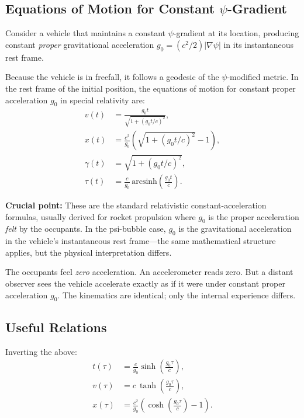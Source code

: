 \documentclass[aps,prd,twocolumn,superscriptaddress,nofootinbib]{revtex4-2}
\begin{document}
\subsection{Equations of Motion for Constant $\psi$-Gradient}

Consider a vehicle that maintains a constant $\psi$-gradient at
its location, producing constant \textit{proper} gravitational
acceleration $g_0 = (c^2/2)|\nabla\psi|$ in its instantaneous rest
frame.

Because the vehicle is in freefall, it follows a geodesic of the
$\psi$-modified metric.  In the rest frame of the initial position,
the equations of motion for constant proper acceleration $g_0$
in special relativity are:
\begin{align}
v(t) &= \frac{g_0 t}{\sqrt{1 + (g_0 t/c)^2}}, \label{eq:v-of-t}\\
x(t) &= \frac{c^2}{g_0}\left(\sqrt{1 + (g_0 t/c)^2} - 1\right),
\label{eq:x-of-t}\\
\gamma(t) &= \sqrt{1 + (g_0 t/c)^2}, \label{eq:gamma-of-t}\\
\tau(t) &= \frac{c}{g_0}\,\text{arcsinh}\!\left(\frac{g_0 t}{c}\right).
\label{eq:tau-of-t}
\end{align}

\textbf{Crucial point:} These are the standard relativistic
constant-acceleration formulas, usually derived for rocket propulsion
where $g_0$ is the proper acceleration \textit{felt} by the occupants.
In the psi-bubble case, $g_0$ is the gravitational acceleration
in the vehicle's instantaneous rest frame---the same mathematical
structure applies, but the physical interpretation differs.

The occupants feel \textit{zero} acceleration.  An accelerometer
reads zero.  But a distant observer sees the vehicle accelerate
exactly as if it were under constant proper acceleration $g_0$.
The kinematics are identical; only the internal experience differs.

\subsection{Useful Relations}

Inverting the above:
\begin{align}
t(\tau) &= \frac{c}{g_0}\sinh\!\left(\frac{g_0\tau}{c}\right),
\label{eq:t-of-tau}\\
v(\tau) &= c\,\tanh\!\left(\frac{g_0\tau}{c}\right),
\label{eq:v-of-tau}\\
x(\tau) &= \frac{c^2}{g_0}\left(\cosh\!\left(\frac{g_0\tau}{c}
\right) - 1\right). \label{eq:x-of-tau}
\end{align}
\end{document}

